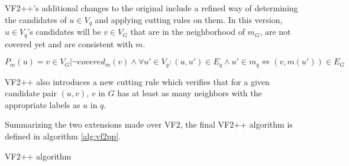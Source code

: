VF2++'s additional changes to the original include a refined way of determining the candidates
of $u \in V_q$ and applying cutting rules on them. In this version, $u \in V_q$'s candidates will be 
$v \in V_G$ that are in the neighborhood of $m_G$, are not covered yet and are consistent with $m$.

\[ P_m(u) = {v \in V_G | \neg covered_m(v) \land \forall u' \in V_q: (u, u') \in E_q \land u' \in m_q \iff (v, m(u')) \in E_G}  \]

VF2++ also introduces a new cutting rule which verifies that for a given candidate pair $(u, v)$,
$v$ in $G$ has at least as many neighbors with the appropriate labels as $u$ in $q$. 

Summarizing the two extensions made over VF2, the final VF2++ algorithm is defined in algorithm \ref{alg:vf2pp}.

\begin{algorithm}[h!]
    \caption{VF2++ algorithm}
    \label{alg:vf2pp}    
    \SetAlgoLined\DontPrintSemicolon
\end{algorithm}


